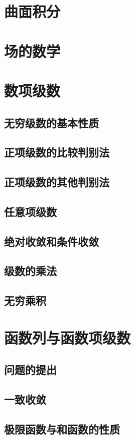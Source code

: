 \documentclass[a4paper, 11pt]{ctexbook}
\begin{document}
        \chapter{曲面积分}
        \chapter{场的数学}
        \chapter{数项级数}
            \section{无穷级数的基本性质}
                
            \section{正项级数的比较判别法}
                
            \section{正项级数的其他判别法}
                
            \section{任意项级数}
                
            \section{绝对收敛和条件收敛}
                
            \section{级数的乘法}
                
            \section{无穷乘积}
                
        \chapter{函数列与函数项级数}
            \section{问题的提出}
            \section{一致收敛}
                
            \section{极限函数与和函数的性质}
                
\end{document}
